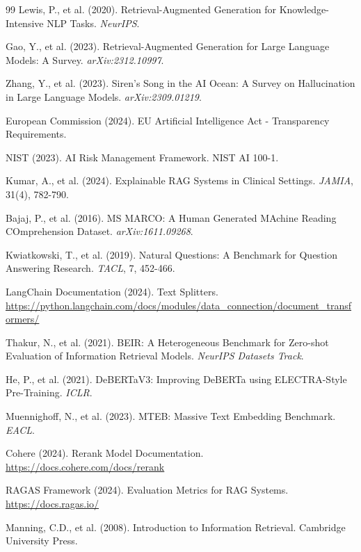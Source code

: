 \documentclass[11pt,a4paper]{article}
\begin{document}
\begin{thebibliography}{99}
 Lewis, P., et al. (2020). Retrieval-Augmented Generation for Knowledge-Intensive NLP Tasks. \textit{NeurIPS}.

 Gao, Y., et al. (2023). Retrieval-Augmented Generation for Large Language Models: A Survey. \textit{arXiv:2312.10997}.

 Zhang, Y., et al. (2023). Siren's Song in the AI Ocean: A Survey on Hallucination in Large Language Models. \textit{arXiv:2309.01219}.

 European Commission (2024). EU Artificial Intelligence Act - Transparency Requirements.

 NIST (2023). AI Risk Management Framework. NIST AI 100-1.

 Kumar, A., et al. (2024). Explainable RAG Systems in Clinical Settings. \textit{JAMIA}, 31(4), 782-790.

 Bajaj, P., et al. (2016). MS MARCO: A Human Generated MAchine Reading COmprehension Dataset. \textit{arXiv:1611.09268}.

 Kwiatkowski, T., et al. (2019). Natural Questions: A Benchmark for Question Answering Research. \textit{TACL}, 7, 452-466.

 LangChain Documentation (2024). Text Splitters. \url{https://python.langchain.com/docs/modules/data_connection/document_transformers/}

 Thakur, N., et al. (2021). BEIR: A Heterogeneous Benchmark for Zero-shot Evaluation of Information Retrieval Models. \textit{NeurIPS Datasets Track}.

 He, P., et al. (2021). DeBERTaV3: Improving DeBERTa using ELECTRA-Style Pre-Training. \textit{ICLR}.

 Muennighoff, N., et al. (2023). MTEB: Massive Text Embedding Benchmark. \textit{EACL}.

 Cohere (2024). Rerank Model Documentation. \url{https://docs.cohere.com/docs/rerank}

 RAGAS Framework (2024). Evaluation Metrics for RAG Systems. \url{https://docs.ragas.io/}

 Manning, C.D., et al. (2008). Introduction to Information Retrieval. Cambridge University Press.

\end{thebibliography}
\end{document}
